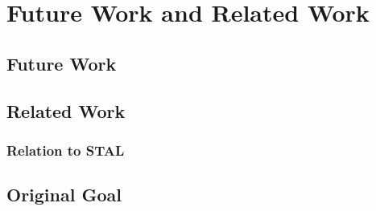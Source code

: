 \chapter{Future Work and Related Work}
\label{chap:future}
\section{Future Work}
\section{Related Work}
\subsection{Relation to STAL}
\label{sec:rel-stal}

\section{Original Goal}

